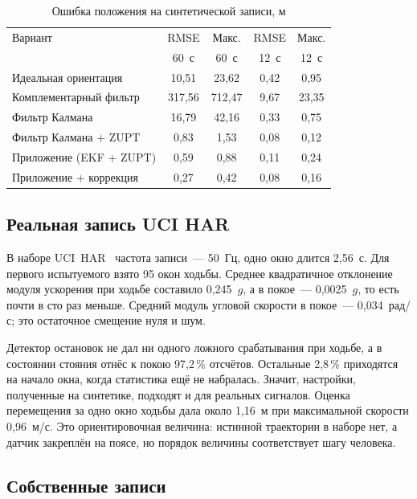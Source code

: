 \documentclass{misisarticle}
\begin{document}
\begin{table}[H]
  \caption{Ошибка положения на синтетической записи, м}
  \label{tab:pos}
  \centering
  \footnotesize
  \setlength{\tabcolsep}{3pt}
  \begin{tabular}{lcccc}
    \toprule
    Вариант & RMSE & Макс. & RMSE & Макс. \\
     & 60~с & 60~с & 12~с & 12~с \\
    \midrule
    Идеальная ориентация & 10,51 & 23,62 & 0,42 & 0,95 \\
    Комплементарный фильтр & 317,56 & 712,47 & 9,67 & 23,35 \\
    Фильтр Калмана & 16,79 & 42,16 & 0,33 & 0,75 \\
    Фильтр Калмана + ZUPT & 0,83 & 1,53 & 0,08 & 0,12 \\
    Приложение (EKF + ZUPT) & 0,59 & 0,88 & 0,11 & 0,24 \\
    Приложение + коррекция & 0,27 & 0,42 & 0,08 & 0,16 \\
    \bottomrule
  \end{tabular}
\end{table}

\subsection{Реальная запись UCI HAR}

В наборе UCI~HAR~\cite{uci} частота записи~--- 50~Гц, одно окно длится 2,56~с. Для первого испытуемого взято 95 окон ходьбы. Среднее квадратичное отклонение модуля ускорения при ходьбе составило 0,245~$g$, а в покое~--- 0,0025~$g$, то есть почти в сто раз меньше. Средний модуль угловой скорости в покое~--- 0,034~рад/с; это остаточное смещение нуля и шум.

Детектор остановок не дал ни одного ложного срабатывания при ходьбе, а в состоянии стояния отнёс к покою 97,2\,\% отсчётов. Остальные 2,8\,\% приходятся на начало окна, когда статистика ещё не набралась. Значит, настройки, полученные на синтетике, подходят и для реальных сигналов. Оценка перемещения за одно окно ходьбы дала около 1,16~м при максимальной скорости 0,96~м/с. Это ориентировочная величина: истинной траектории в наборе нет, а датчик закреплён на поясе, но порядок величины соответствует шагу человека.

\subsection{Собственные записи}
\end{document}
